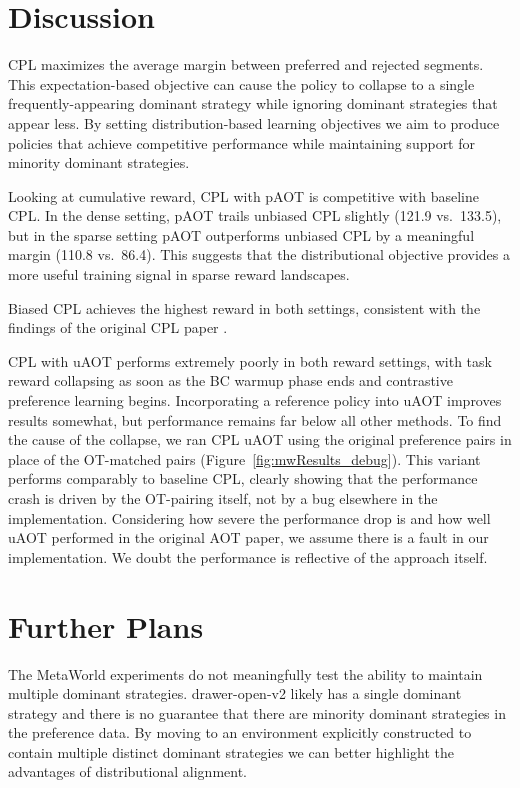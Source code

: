 \documentclass[11pt]{article}
\begin{document}
\section{Discussion}

CPL maximizes the average margin between preferred and rejected segments. This expectation-based objective can cause the policy to collapse to a single frequently-appearing dominant strategy while ignoring dominant strategies that appear less. By setting distribution-based learning objectives we aim to produce policies that achieve competitive performance while maintaining support for minority dominant strategies.

Looking at cumulative reward, CPL with pAOT is competitive with baseline CPL. In the dense setting, pAOT trails unbiased CPL slightly (121.9 vs.\ 133.5), but in the sparse setting pAOT outperforms unbiased CPL by a meaningful margin (110.8 vs.\ 86.4). This suggests that the distributional objective provides a more useful training signal in sparse reward landscapes.

Biased CPL achieves the highest reward in both settings, consistent with the findings of the original CPL paper \cite{hejna2024cpl}.

CPL with uAOT performs extremely poorly in both reward settings, with task reward collapsing as soon as the BC warmup phase ends and contrastive preference learning begins. Incorporating a reference policy into uAOT improves results somewhat, but performance remains far below all other methods. To find the cause of the collapse, we ran CPL uAOT using the original preference pairs in place of the OT-matched pairs (Figure~\ref{fig:mwResults_debug}). This variant performs comparably to baseline CPL, clearly showing that the performance crash is driven by the OT-pairing itself, not by a bug elsewhere in the implementation. Considering how severe the performance drop is and how well uAOT performed in the original AOT paper, we assume there is a fault in our implementation. We doubt the performance is reflective of the approach itself.


\section{Further Plans}

The MetaWorld experiments do not meaningfully test the ability to maintain multiple dominant strategies. drawer-open-v2 likely has a single dominant strategy and there is no guarantee that there are minority dominant strategies in the preference data. By moving to an environment explicitly constructed to contain multiple distinct dominant strategies we can better highlight the advantages of distributional alignment.
\end{document}
